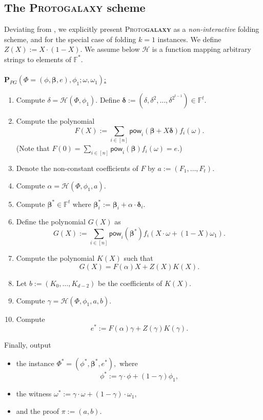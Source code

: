 \documentclass[11pt]{article} %
\newcommand{\protogal}{{\normalfont\scshape Proto\bfseries{galaxy}}\xspace}
\newcommand{\F}{\ensuremath{\mathbb F}\xspace}
\newcommand{\Fstar}{\ensuremath{\mathbb F^*}\xspace}
\newcommand{\rej}{\ensuremath{\mathsf{reject}}\xspace}
\newcommand{\defeq}{:=}
\newcommand{\hash}{\ensuremath{\mathcal{H}}\xspace}
\newcommand{\prf}{\ensuremath{\mathsf{\pi}}\xspace}
\newcommand{\inst}{\ensuremath{\phi}\xspace}
\newcommand{\wit}{\ensuremath{\mathsf{\omega}}\xspace}
\newcommand{\ver}{\ensuremath{\mathsf{\mathbf{V}}}\xspace}
\newcommand{\per}{\ensuremath{\mathsf{\mathbf{P}}}\xspace}
\newcommand{\perpg}{\ensuremath{\per_{PG}}\xspace}
\newcommand{\sumi}[1]{\sum_{i\in[#1]}}
\newcommand{\betaa}{\ensuremath{\mathbf{\boldsymbol{\beta}}}\xspace}
\newcommand{\deltaa}{\ensuremath{\mathbf{\boldsymbol{\delta}}}\xspace}
\newcommand{\instt}{\ensuremath{\Phi^*}\xspace}
\newcommand{\insttbase}{\ensuremath{\Phi}\xspace}
\newcommand{\pow}{\ensuremath{\mathsf{pow}}\xspace}
\newcommand{\inststar}{\ensuremath{\inst^*}\xspace}
\newcommand{\witstar}{\ensuremath{\wit^*}\xspace}
\begin{document}
\subsection{The \protogal scheme}
Deviating from \cite{protogalaxy}, we explicitly present \protogal as a \emph{non-interactive} folding scheme, and for the special case of folding $k=1$ instances.
We define $Z(X)\defeq X\cdot(1-X)$. We assume below \hash is a function mapping arbitrary strings to elements of \Fstar. \\ \\ \noindent
\underline{$\perpg(\insttbase=(\inst,\betaa,e),\inst_1;\wit,\wit_1)$:}
\begin{enumerate}
 \item Compute $\delta=\hash(\insttbase,\inst_1)$. Define $\deltaa\defeq (\delta,\delta^2,\ldots,\delta^{2^{t-1}})\in \F^t$.
 \item\label{step:computeF} Compute the polynomial
 \[F(X)\defeq \sumi{n}\pow_i(\betaa+X\deltaa) f_i(\wit).\]
 (Note that $F(0)=\sumi{n} \pow_i(\betaa) f_i(\wit) = e$.)
\item\label{step:sendFcoeffs} Denote the non-constant coefficients of $F$ by $a\defeq (F_1,\ldots,F_t)$.
\item Compute $\alpha = \hash(\insttbase,\inst_1,a)$.
\item\label{step:computeBetastar} Compute $\betaa^*\in \F^t$ where $\betaa^*_i\defeq \betaa_i+\alpha\cdot \deltaa_i$.
\item\label{step:computeG} Define the polynomial $G(X)$ as
\[G(X)\defeq \sumi{n}\pow_i(\betaa^*) f_i(X\cdot \wit + (1-X)\wit_1).\]
\item Compute the polynomial $K(X)$ such that
\[G(X)= F(\alpha) X + Z(X) K(X).\]
\item\label{step:sendK} Let $b\defeq (K_0,\ldots,K_{d-2})$ be the coefficients of $K(X)$.
\item Compute $\gamma=\hash(\insttbase,\inst_1,a,b)$.
\item\label{step:compute-estar} Compute
\[e^* \defeq F(\alpha)\gamma + Z(\gamma)K(\gamma).\]
\end{enumerate}
Finally, output
\begin{itemize}
\item the instance
$\instt=(\inststar,\betaa^*,e^*),$
where \[\inst^*\defeq \gamma\cdot \inst + (1-\gamma) \inst_1,\]
\item the witness
$\witstar\defeq \gamma\cdot \wit + (1-\gamma)\cdot \wit_1,$
\item and the proof $\prf\defeq (a,b)$.\\
\end{itemize}
\noindent
\end{document}
